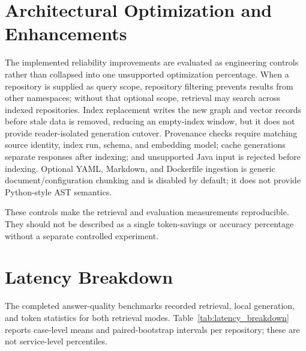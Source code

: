 \documentclass[12pt,letterpaper,oneside]{report}
\begin{document}
\section{Architectural Optimization and Enhancements}
The implemented reliability improvements are evaluated as engineering controls rather than collapsed into one unsupported optimization percentage. When a repository is supplied as query scope, repository filtering prevents results from other namespaces; without that optional scope, retrieval may search across indexed repositories. Index replacement writes the new graph and vector records before stale data is removed, reducing an empty-index window, but it does not provide reader-isolated generation cutover. Provenance checks require matching source identity, index run, schema, and embedding model; cache generations separate responses after indexing; and unsupported Java input is rejected before indexing. Optional YAML, Markdown, and Dockerfile ingestion is generic document/configuration chunking and is disabled by default; it does not provide Python-style AST semantics.

These controls make the retrieval and evaluation measurements reproducible. They should not be described as a single token-savings or accuracy percentage without a separate controlled experiment.

\section{Latency Breakdown}
The completed answer-quality benchmarks recorded retrieval, local generation, and token statistics for both retrieval modes. Table~\ref{tab:latency_breakdown} reports case-level means and paired-bootstrap intervals per repository; these are not service-level percentiles.
\end{document}
